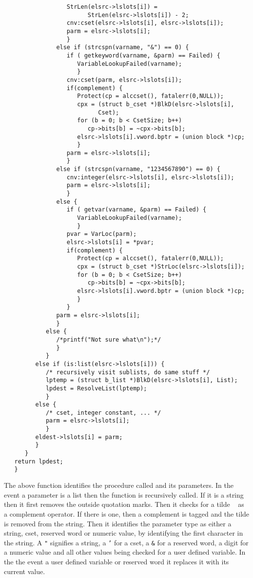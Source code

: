 \documentclass{article}
\begin{document}
\begin{verbatim}
                  StrLen(elsrc->lslots[i]) = 
                        StrLen(elsrc->lslots[i]) - 2;
                  cnv:cset(elsrc->lslots[i], elsrc->lslots[i]);
                  parm = elsrc->lslots[i];
                  }
               else if (strcspn(varname, "&") == 0) {
                  if ( getkeyword(varname, &parm) == Failed) {
                     VariableLookupFailed(varname);
                     }
                  cnv:cset(parm, elsrc->lslots[i]);
                  if(complement) {
                     Protect(cp = alccset(), fatalerr(0,NULL));
                     cpx = (struct b_cset *)BlkD(elsrc->lslots[i], 
                           Cset);
                     for (b = 0; b < CsetSize; b++) 
                        cp->bits[b] = ~cpx->bits[b];
                     elsrc->lslots[i].vword.bptr = (union block *)cp;
                     }
                  parm = elsrc->lslots[i];
                  }
               else if (strcspn(varname, "1234567890") == 0) {
                  cnv:integer(elsrc->lslots[i], elsrc->lslots[i]);
                  parm = elsrc->lslots[i];
                  }
               else {
                  if ( getvar(varname, &parm) == Failed) {
                     VariableLookupFailed(varname);
                     }
                  pvar = VarLoc(parm);
                  elsrc->lslots[i] = *pvar;
                  if(complement) {
                     Protect(cp = alccset(), fatalerr(0,NULL));
                     cpx = (struct b_cset *)StrLoc(elsrc->lslots[i]);
                     for (b = 0; b < CsetSize; b++) 
                        cp->bits[b] = ~cpx->bits[b];
                     elsrc->lslots[i].vword.bptr = (union block *)cp;
                     }
                  }
               parm = elsrc->lslots[i];
               }
            else {
               /*printf("Not sure what\n");*/
               }
            }
         else if (is:list(elsrc->lslots[i])) {
            /* recursively visit sublists, do same stuff */
            lptemp = (struct b_list *)BlkD(elsrc->lslots[i], List);
            lpdest = ResolveList(lptemp);
            }
         else { 
            /* cset, integer constant, ... */
            parm = elsrc->lslots[i];
            }
         eldest->lslots[i] = parm;
         }
      }
   return lpdest;
   }
\end{verbatim}
The above function identifies the procedure called and its parameters.  In the event a parameter is a list then the function is recursively called.  If it is a string then it first removes the outside quotation marks.  Then it checks for a tilde \texttt{~} as a complement operator.  If there is one, then a complement is tagged and the tilde is removed from the string.  Then it identifies the parameter type as either a string, cset, reserved word or numeric value, by identifying the first character in the string.  A \texttt{"} signifies a string, a \texttt{'} for a cset, a \texttt{\&} for a reserved word, a digit for a numeric value and all other values being checked for a user defined variable.  In the the event a user defined variable or reserved word it replaces it with its current value.
\end{document}
